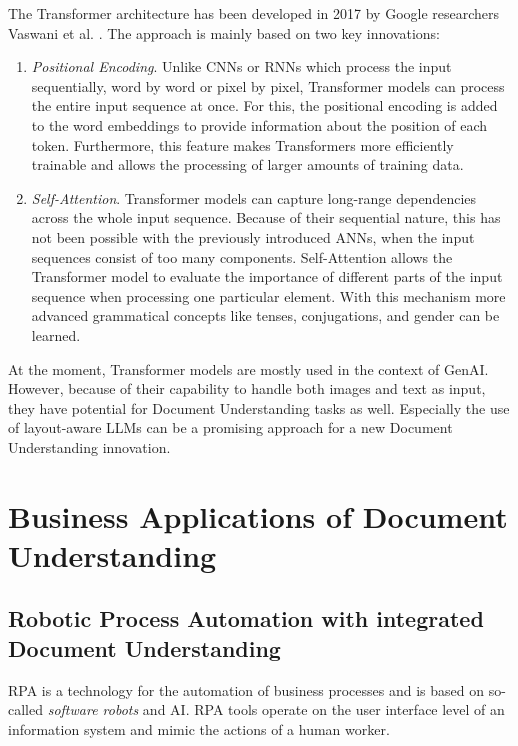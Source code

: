 The Transformer architecture has been developed in 2017 by Google researchers Vaswani et al. \cite{vaswaniattentionneed}. The approach is mainly based on two key innovations:
\begin{enumerate}
    \item \textit{Positional Encoding}. Unlike \acp{CNN} or \acp{RNN} which process the input sequentially, word by word or pixel by pixel, Transformer models can process the entire input sequence at once. For this, the positional encoding is added to the word embeddings to provide information about the position of each token. Furthermore, this feature makes Transformers more efficiently trainable and allows the processing of larger amounts of training data.
    \item \textit{Self-Attention}. Transformer models can capture long-range dependencies across the whole input sequence. Because of their sequential nature, this has not been possible with the previously introduced \acp{ANN}, when the input sequences consist of too many components. Self-Attention allows the Transformer model to evaluate the importance of different parts of the input sequence when processing one particular element. With this mechanism more advanced grammatical concepts like tenses, conjugations, and gender can be learned.
    \cite{brown2020language,vaswaniattentionneed}

\end{enumerate}

At the moment, Transformer models are mostly used in the context of \ac{GenAI}. However, because of their capability to handle both images and text as input, they have potential for Document Understanding tasks as well. Especially the use of layout-aware \acp{LLM} can be a promising approach for a new Document Understanding innovation.
\cite{wang2023docllm,brown2020language}

\newpage
\section{Business Applications of Document Understanding}
\subsection{Robotic Process Automation with integrated Document Understanding}
\ac{RPA} is a technology for the automation of business processes and is based on so-called \textit{software robots} and \ac{AI}. \ac{RPA} tools operate on the user interface level of an information system and mimic the actions of a human worker. 
\cite{van2018robotic}

